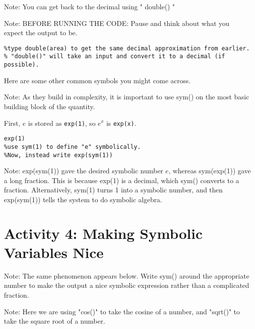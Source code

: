 \documentclass{ximera}
\begin{document}
\begin{example}
\begin{remark}
Note: You can get back to the decimal using " double() "
\end{remark}

\begin{remark}
Note: BEFORE RUNNING THE CODE: Pause and think about what you expect the output to be.
\end{remark}

\begin{verbatim}
%type double(area) to get the same decimal approximation from earlier.
% "double()" will take an input and convert it to a decimal (if possible).
\end{verbatim}
\end{example}

Here are some other common symbols you might come across. 
\begin{remark}
Note: As they build in complexity, it is important to use sym() on the most basic building block of the quantity.
\end{remark}

First, \(e\) is stored as \texttt{exp(1)}, so \(e^x\) is \texttt{exp(x)}.

\begin{verbatim}
exp(1)
%use sym(1) to define "e" symbolically. 
%Now, instead write exp(sym(1))
\end{verbatim}

\begin{remark}
Note: exp(sym(1)) gave the desired symbolic number \(e\), whereas sym(exp(1)) gave a long fraction. This is because exp(1) is a decimal, which sym() converts to a fraction. Alternatively, sym(1) turns 1 into a symbolic number, and then exp(sym(1)) tells the system to do symbolic algebra.
\end{remark}

\section*{Activity 4: Making Symbolic Variables Nice}

\begin{remark}
Note: The same phenomenon appears below. Write sym() around the appropriate number to make the output a nice symbolic expression rather than a complicated fraction.
\end{remark}

\begin{remark}
Note: Here we are using "cos()" to take the cosine of a number, and "sqrt()" to take the square root of a number.
\end{remark}
\end{document}
